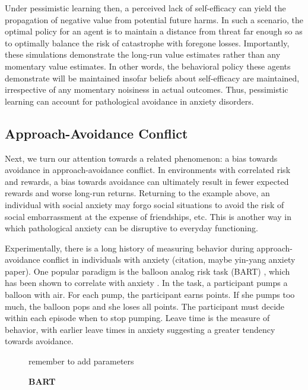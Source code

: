 \documentclass[11pt]{article} %
\begin{document}
Under pessimistic learning then, a perceived lack of self-efficacy can yield the propagation of negative value from potential future harms. In such a scenario, the optimal policy for an agent is to maintain a distance from threat far enough so as to optimally balance the risk of catastrophe with foregone losses. Importantly, these simulations demonstrate the long-run value estimates rather than any momentary value estimates. In other words, the behavioral policy these agents demonstrate will be maintained insofar beliefs about self-efficacy are maintained, irrespective of any momentary noisiness in actual outcomes. Thus, pessimistic learning can account for pathological avoidance in anxiety disorders.

\subsection{Approach-Avoidance Conflict}

Next, we turn our attention towards a related phenomenon: a bias towards avoidance in approach-avoidance conflict. In environments with correlated risk and rewards, a bias towards avoidance can ultimately result in fewer expected rewards and worse long-run returns. Returning to the example above, an individual with social anxiety may forgo social situations to avoid the risk of social embarrassment at the expense of friendships, etc. This is another way in which pathological anxiety can be disruptive to everyday functioning.

Experimentally, there is a long history of measuring behavior during approach-avoidance conflict in individuals with anxiety (citation, maybe yin-yang anxiety paper). One popular paradigm is the balloon analog risk task (BART) \citep{Lejuez2002}, which has been shown to correlate with anxiety \cite{Maner2007, Giorgetta2012}. In the task, a participant pumps a balloon with air. For each pump, the participant earns points. If she pumps too much, the balloon pops and she loses all points. The participant must decide within each episode when to stop pumping. Leave time is the measure of behavior, with earlier leave times in anxiety suggesting a greater tendency towards avoidance.

\begin{figure}
  \centerline{%
  }
  \caption{\textbf{BART}}
  \par remember to add parameters
\end{figure}
\end{document}
